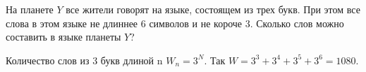 
На планете $Y$ все жители говорят на языке, состоящем из трех букв. При этом все слова в этом языке не длиннее 6 символов и не короче 3. Сколько слов можно составить в языке планеты $Y$?

\solutionSection

Количество слов из 3 букв длиной n $W_n = 3^N$. Так $W = 3^3 + 3^4 + 3^5 + 3^6 = 1080$.


